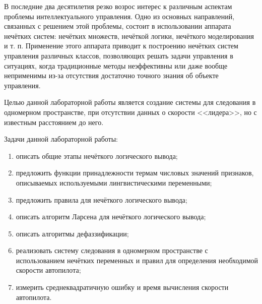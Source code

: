 
В последние два десятилетия резко возрос интерес к различным аспектам
проблемы интеллектуального управления. Одно из основных направлений, связанных с решением этой проблемы, состоит в использовании аппарата нечётких систем: нечётких множеств, нечёткой логики, нечёткого
моделирования и т. п. Применение этого аппарата приводит к построению нечётких систем управления различных классов, позволяющих решать задачи управления в ситуациях, когда традиционные методы неэффективны или даже вообще неприменимы из-за отсутствия достаточно
точного знания об объекте управления.~\cite{book}

Целью данной лабораторной работы является создание системы для следования в одномерном пространстве, при отсутствии данных о скорости <<лидера>>, но с известным расстоянием до него.

Задачи данной лабораторной работы:
\begin{enumerate}[label*=\arabic*)]
	\item описать общие этапы нечёткого логического вывода;
	\item предложить функции принадлежности термам числовых значений признаков, описываемых используемыми лингвистическими переменными;
	\item предложить правила для нечёткого логического вывода;
	\item описать алгоритм Ларсена для нечёткого логического вывода;
	\item описать алгоритмы дефаззификации;
	\item реализовать систему следования в одномерном пространстве с использованием нечётких переменных и правил для определения необходимой скорости автопилота;
	\item измерить среднеквадратичную ошибку и время вычисления скорости автопилота.
\end{enumerate}

\clearpage
